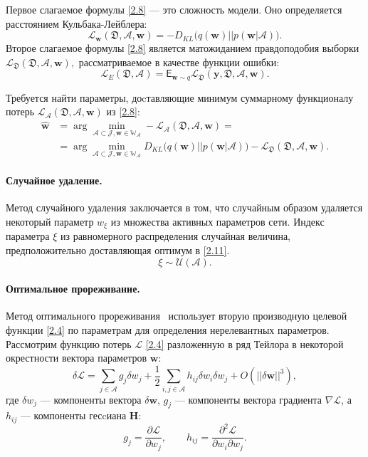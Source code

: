 Первое слагаемое формулы \eqref{2.8} --- это сложность модели. Оно определяется расстоянием Кульбака-Лейблера:
\[
\label{2.9}
\mathcal{L}_\textbf{w}(\mathfrak{D}, \mathcal{A}, \textbf{w}) = -D_{KL}\bigl(q(\textbf{w})||p(\textbf{w}|\mathcal{A})\bigr).
\]
Второе слагаемое формулы \eqref{2.8} является матожиданием правдоподобия выборки $\mathcal{L}_\mathfrak{D}(\mathfrak{D},\mathcal{A}, \textbf{w}),$ рассматриваемое в качестве функции ошибки:
\[
\label{2.10}
\mathcal{L}_{E}(\mathfrak{D},\mathcal{A}) = \mathsf{E}_{\textbf{w}\sim q}\mathcal{L}_\mathfrak{D}(\textbf{y}, \mathfrak{D}, \mathcal{A}, \textbf{w}).
\]

Требуется найти параметры, доcтавляющие минимум суммарному функционалу потерь $\mathcal{L}_\mathcal{A}(\mathfrak{D},\mathcal{A},\textbf{w})$ из \eqref{2.8}:
\[
\label{2.11}
\begin{aligned}
\hat{\textbf{w}} &= \arg\min_{\mathcal{A}\subset\mathcal{J}, \textbf{w} \in \mathbb{W_\mathcal{A}}} -\mathcal{L}_\mathcal{A}(\mathfrak{D}, \mathcal{A}, \textbf{w}) = \\
&=\arg\min_{\mathcal{A}\subset\mathcal{J}, \textbf{w} \in \mathbb{W_\mathcal{A}}} D_{KL}\bigl(q(\textbf{w})||p(\textbf{w}|\mathcal{A})\bigr) - \mathcal{L}_\mathfrak{D}(\mathfrak{D}, \mathcal{A}, \textbf{w}).
\end{aligned}
\]

\paragraph{Случайное удаление.}
Метод случайного удаления заключается в том, что случайным образом удаляется некоторый параметр $w_\xi$ из множества активных параметров сети.  Индекс параметра $\xi$ из равномерного распределения  случайная величина, предположительно доставляющая оптимум в \eqref{2.11}.
\[
\label{3.1.1}
\xi \sim \mathcal{U}(\mathcal{A}).
\]

\paragraph{Оптимальное прореживание.}
Метод оптимального прореживания~\cite{cun1990} использует вторую производную целевой функции \eqref{2.4} по параметрам для определения нерелевантных параметров. Рассмотрим функцию потерь $\mathcal{L}$ \eqref{2.4} разложенную в ряд Тейлора в некоторой окрестности вектора параметров $\textbf{w}$:
\[
\label{3.2.1}
\delta \mathcal{L} = \sum_{j\in \mathcal{A}} g_j\delta w_j + \frac{1}{2}\sum_{i,j\in \mathcal{A}} h_{ij}\delta w_i\delta w_j + O(||\delta\textbf{w}||^3),
\]
где $\delta w_j $ --- компоненты вектора $\delta\textbf{w}$, $g_j$ --- компоненты вектора градиента $\nabla \mathcal{L}$, а $h_{ij}$ --- компоненты гесcиана $\textbf{H}$:
\[
\label{3.2.2}
g_j = \frac{\partial \mathcal{L}}{\partial w_j}, \qquad h_{ij} = \frac{\partial^2\mathcal{L}}{\partial w_i \partial w_j}.
\]

